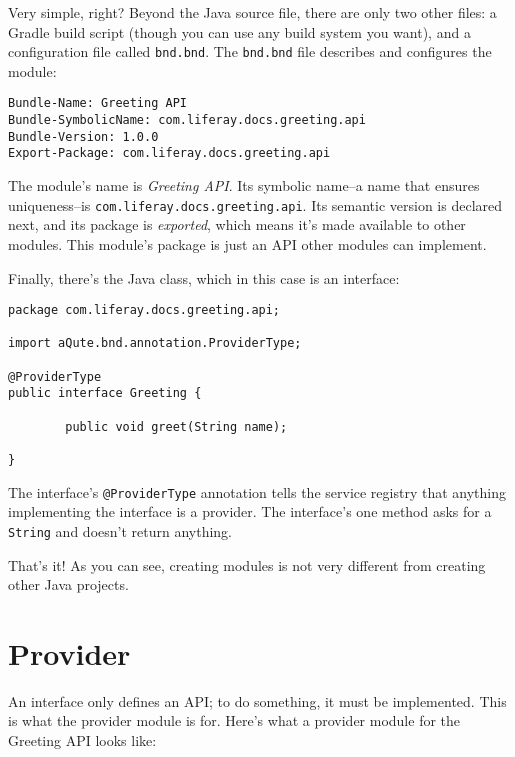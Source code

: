 Very simple, right? Beyond the Java source file, there are only two
other files: a Gradle build script (though you can use any build system
you want), and a configuration file called \texttt{bnd.bnd}. The
\texttt{bnd.bnd} file describes and configures the module:

\begin{verbatim}
Bundle-Name: Greeting API
Bundle-SymbolicName: com.liferay.docs.greeting.api
Bundle-Version: 1.0.0
Export-Package: com.liferay.docs.greeting.api
\end{verbatim}

The module's name is \emph{Greeting API}. Its symbolic name--a name that
ensures uniqueness--is \texttt{com.liferay.docs.greeting.api}. Its
semantic version is declared next, and its package is \emph{exported},
which means it's made available to other modules. This module's package
is just an API other modules can implement.

Finally, there's the Java class, which in this case is an interface:

\begin{verbatim}
package com.liferay.docs.greeting.api;

import aQute.bnd.annotation.ProviderType;

@ProviderType
public interface Greeting {

        public void greet(String name);

}
\end{verbatim}

The interface's \texttt{@ProviderType} annotation tells the service
registry that anything implementing the interface is a provider. The
interface's one method asks for a \texttt{String} and doesn't return
anything.

That's it! As you can see, creating modules is not very different from
creating other Java projects.

\section{Provider}\label{provider}

An interface only defines an API; to do something, it must be
implemented. This is what the provider module is for. Here's what a
provider module for the Greeting API looks like:

